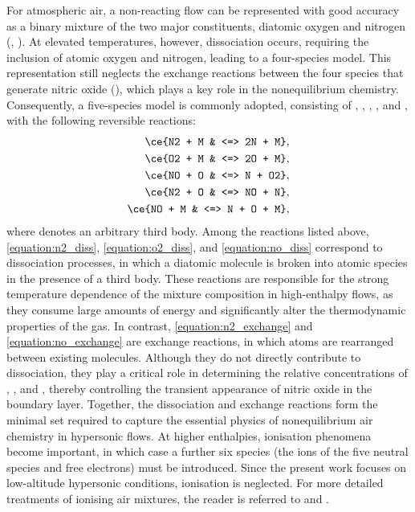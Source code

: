For atmospheric air, a non-reacting flow can be represented with good accuracy as a binary mixture of the two major constituents, diatomic oxygen and nitrogen (, ). At elevated temperatures, however, dissociation occurs, requiring the inclusion of atomic oxygen and nitrogen, leading to a four-species model. This representation still neglects the exchange reactions between the four species that generate nitric oxide (), which plays a key role in the nonequilibrium chemistry. Consequently, a five-species model is commonly adopted, consisting of , , , , and , with the following reversible reactions:
\begin{align}
    \ce{N2 + M & <=> 2N + M}, \label{equation:n2_diss} \\ 
    \ce{O2 + M & <=> 2O + M}, \label{equation:o2_diss} \\
    \ce{NO + O & <=> N + O2}, \label{equation:no_exchange} \\
    \ce{N2 + O & <=> NO + N}, \label{equation:n2_exchange} \\
    \ce{NO + M & <=> N + O + M}, \label{equation:no_diss}
\end{align}
where  denotes an arbitrary third body. Among the reactions listed above, \eqref{equation:n2_diss}, \eqref{equation:o2_diss}, and \eqref{equation:no_diss} correspond to dissociation processes, in which a diatomic molecule is broken into atomic species in the presence of a third body. These reactions are responsible for the strong temperature dependence of the mixture composition in high-enthalpy flows, as they consume large amounts of energy and significantly alter the thermodynamic properties of the gas. In contrast, \eqref{equation:n2_exchange} and \eqref{equation:no_exchange} are exchange reactions, in which atoms are rearranged between existing molecules. Although they do not directly contribute to dissociation, they play a critical role in determining the relative concentrations of , , and , thereby controlling the transient appearance of nitric oxide in the boundary layer. Together, the dissociation and exchange reactions form the minimal set required to capture the essential physics of nonequilibrium air chemistry in hypersonic flows. At higher enthalpies, ionisation phenomena become important, in which case a further six species (the ions of the five neutral species and free electrons) must be introduced. Since the present work focuses on low-altitude hypersonic conditions, ionisation is neglected. For more detailed treatments of ionising air mixtures, the reader is referred to \citet{BoseCandler1998} and \citet{ChaudhryEtAl2018}.

